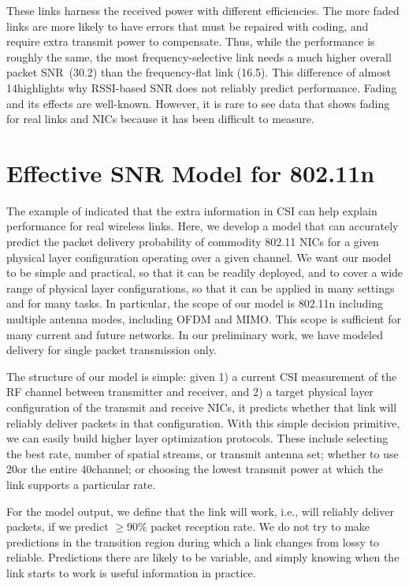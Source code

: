 These links harness the received power with different efficiencies.
The more faded links are more likely to have errors that must be repaired with coding, and require extra transmit power to compensate. Thus, while the performance is roughly the same, the most frequency-selective link needs a much higher overall packet SNR~(30.2\dB) than the frequency-flat link (16.5\dB). This difference of almost 14\dB highlights why RSSI-based SNR does not reliably predict performance. Fading and its effects are well-known. However, it is rare to see data that shows fading for real links and NICs because it has been difficult to measure.

\section{Effective SNR Model for 802.11n}
The example of  indicated that the extra information in CSI can help explain performance for real wireless links. Here, we develop a model that can accurately predict the packet delivery probability of commodity 802.11 NICs for a given physical layer configuration operating over a given channel. We want our model to be simple and practical, so that it can be readily deployed, and to cover a wide range of physical layer configurations, so that it can be applied in many settings and for many tasks. In particular, the scope of our model is 802.11n including multiple antenna modes, including OFDM and MIMO\@. This scope is sufficient for many current and future networks. In our preliminary work, we have modeled delivery for single packet transmission only.

The structure of our model is simple: given 1) a current CSI measurement of the RF channel between transmitter and receiver, and 2) a target physical layer configuration of the transmit and receive NICs, it predicts whether that link will reliably deliver packets in that configuration.
With this simple decision primitive, we can easily build higher layer optimization protocols. These include selecting the best rate, number of spatial streams, or transmit antenna set; whether to use 20\MHz or the entire 40\MHz channel; or choosing the lowest transmit power at which the link supports a particular rate.

For the model output, we define that the link will work, i.e., will reliably deliver packets, if we predict $\geq$90\% packet reception rate. We do not try to make predictions in the transition region during which a link changes from lossy to reliable. Predictions there are likely to be variable, and simply knowing when the link starts to work is useful information in practice.

